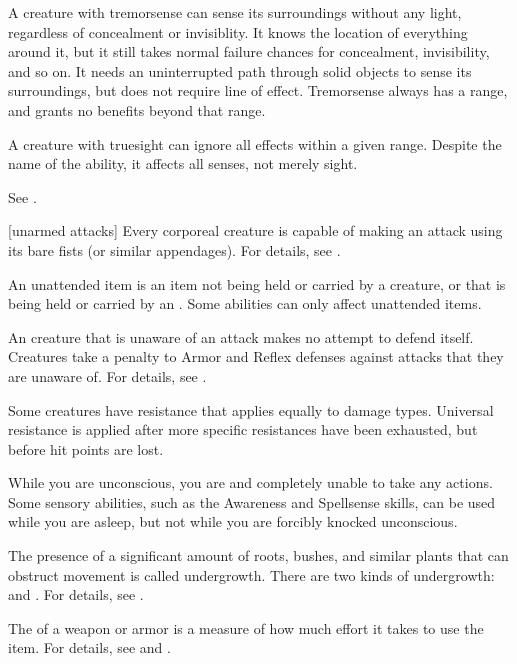  A creature with tremorsense can sense its surroundings without any light, regardless of concealment or invisiblity.
It knows the location of everything around it, but it still takes normal failure chances for concealment, invisibility, and so on.
It needs an uninterrupted path through solid objects to sense its surroundings, but does not require line of effect.
Tremorsense always has a range, and grants no benefits beyond that range.

 A creature with truesight can ignore all  effects within a given range.
Despite the name of the ability, it affects all senses, not merely sight.

 See .

[unarmed attacks] Every corporeal creature is capable of making an attack using its bare fists (or similar appendages).
For details, see .

 An unattended item is an item not being held or carried by a creature, or that is being held or carried by an .
Some abilities can only affect unattended items.

 An creature that is unaware of an attack makes no attempt to defend itself.
Creatures take a  penalty to Armor and Reflex defenses against attacks that they are unaware of.
For details, see .

 Some creatures have resistance that applies equally to damage types.
Universal resistance is applied after more specific resistances have been exhausted, but before hit points are lost.

 While you are unconscious, you are  and completely unable to take any actions.
Some sensory abilities, such as the Awareness and Spellsense skills, can be used while you are asleep, but not while you are forcibly knocked unconscious.

 The presence of a significant amount of roots, bushes, and similar plants that can obstruct movement is called undergrowth.
There are two kinds of undergrowth:  and .
For details, see .

 The  of a weapon or armor is a measure of how much effort it takes to use the item.
For details, see  and .

